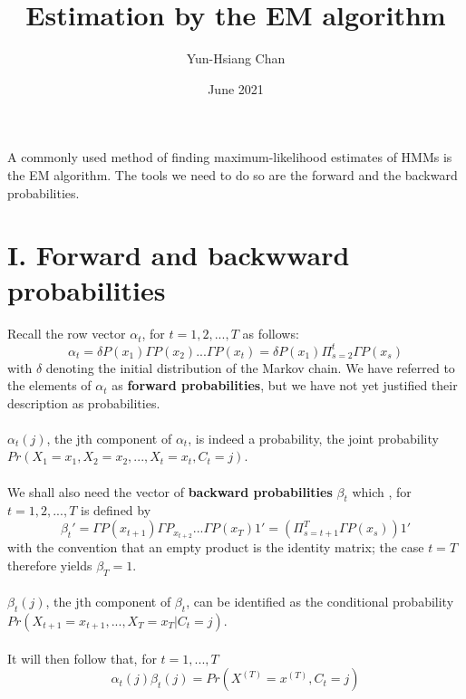 \documentclass{article}
\title{Estimation by the EM algorithm}
\author{Yun-Hsiang Chan}
\date{June 2021}
\begin{document}
\maketitle

A commonly used method of finding maximum-likelihood estimates of HMMs is the EM algorithm. The tools we need to do so are the forward and the backward probabilities. 

\section*{I. Forward and backwward probabilities}
Recall the row vector $\alpha_t$, for $t = 1, 2, ..., T$ as follows:
$$\alpha_t = \delta P(x_1) \Gamma P(x_2) ... \Gamma P(x_t) = \delta P(x_1) \Pi_{s=2}^t \Gamma P(x_s)$$
with $\delta$ denoting the initial distribution of the Markov chain. We have referred to the elements of $\alpha_t$ as \textbf{forward probabilities}, but we have not yet justified their description as probabilities. \\
\\
$\alpha_t(j)$, the jth component of $\alpha_t$, is indeed a probability, the joint probability $Pr(X_1 = x_1, X_2 = x_2, ..., X_t = x_t, C_t = j)$. \\
\\
We shall also need the vector of \textbf{backward probabilities} $\beta_t$ which , for $t = 1, 2, ..., T$ is defined by
$$\beta_t' = \Gamma P(x_{t+1}) \Gamma P_{x_{t+2}} ... \Gamma P(x_T) 1' = (\Pi_{s=t+1}^T \Gamma P(x_s)) 1'$$
with the convention that an empty product is the identity matrix; the case $t = T$ therefore yields $\beta_T = 1$. \\
\\
$\beta_t(j)$, the jth component of $\beta_t$, can be identified as the conditional probability $Pr(X_{t+1} = x_{t+1}, ..., X_T = x_T | C_t = j)$. \\
\\
It will then follow that, for $t = 1, ..., T$
$$\alpha_t (j) \beta_t (j) = Pr(X^{(T)} = x^{(T)}, C_t = j)$$
\end{document}
